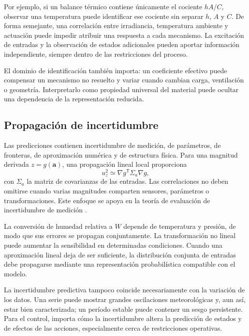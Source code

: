 Por ejemplo, si un balance térmico contiene únicamente el cociente $hA/C$, observar una temperatura puede identificar ese cociente sin separar $h$, $A$ y $C$. De forma semejante, una correlación entre irradiancia, temperatura ambiente y actuación puede impedir atribuir una respuesta a cada mecanismo. La excitación de entradas y la observación de estados adicionales pueden aportar información independiente, siempre dentro de las restricciones del proceso.

El dominio de identificación también importa: un coeficiente efectivo puede compensar un mecanismo no resuelto y variar cuando cambian carga, ventilación o geometría. Interpretarlo como propiedad universal del material puede ocultar una dependencia de la representación reducida.

\subsection{Propagación de incertidumbre}

Las predicciones contienen incertidumbre de medición, de parámetros, de fronteras, de aproximación numérica y de estructura física. Para una magnitud derivada $z=g(\mathbf a)$, una propagación lineal local proporciona
\begin{equation}
u_z^2\simeq\nabla g^{\mathsf T}\Sigma_a\nabla g,
\label{eq:propagacion_incertidumbre}
\end{equation}
con $\Sigma_a$ la matriz de covarianzas de las entradas. Las correlaciones no deben omitirse cuando varias magnitudes comparten sensores, parámetros o transformaciones. Este enfoque se apoya en la teoría de evaluación de incertidumbre de medición \cite{jcgm2008}.

La conversión de humedad relativa a $W$ depende de temperatura y presión, de modo que sus errores se propagan conjuntamente. La transformación no lineal puede aumentar la sensibilidad en determinadas condiciones. Cuando una aproximación lineal deja de ser suficiente, la distribución conjunta de entradas debe propagarse mediante una representación probabilística compatible con el modelo.

La incertidumbre predictiva tampoco coincide necesariamente con la variación de los datos. Una serie puede mostrar grandes oscilaciones meteorológicas y, aun así, estar bien caracterizada; un período estable puede contener un sesgo persistente. Para el control, importa cómo la incertidumbre altera la predicción de estados y de efectos de las acciones, especialmente cerca de restricciones operativas.

